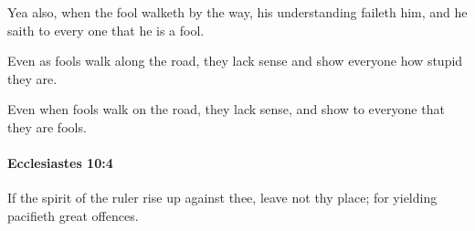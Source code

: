 			\begin{versebox}
					\item[BHS] 
					\item[LXX] 
					\item[ASV] Yea also, when the fool walketh by the way, his understanding faileth him, and he saith to every one that he is a fool.
					\item[NIV] Even as fools walk along the road, they lack sense and show everyone how stupid they are.
					\item[NRSV] Even when fools walk on the road, they lack sense, and show to everyone that they are fools.
			\end{versebox}

		\paragraph{Ecclesiastes 10:4} %
			\label{ECCLESIASTES-10-4}

			If the spirit of the ruler rise up against thee, leave not thy place; for yielding pacifieth great offences.

